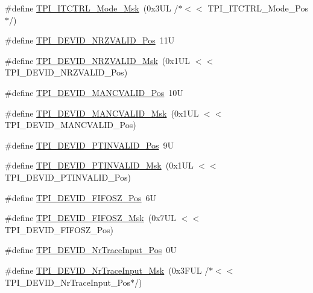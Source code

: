 \begin{DoxyCompactItemize}
\item 
\#define \hyperlink{group___c_m_s_i_s___t_p_i_gad6f87550b468ad0920d5f405bfd3f017}{T\+P\+I\+\_\+\+I\+T\+C\+T\+R\+L\+\_\+\+Mode\+\_\+\+Msk}~(0x3\+U\+L /$\ast$$<$$<$ T\+P\+I\+\_\+\+I\+T\+C\+T\+R\+L\+\_\+\+Mode\+\_\+\+Pos$\ast$/)
\item 
\#define \hyperlink{group___c_m_s_i_s___t_p_i_ga9f46cf1a1708575f56d6b827766277f4}{T\+P\+I\+\_\+\+D\+E\+V\+I\+D\+\_\+\+N\+R\+Z\+V\+A\+L\+I\+D\+\_\+\+Pos}~11U
\item 
\#define \hyperlink{group___c_m_s_i_s___t_p_i_gacecc8710a8f6a23a7d1d4f5674daf02a}{T\+P\+I\+\_\+\+D\+E\+V\+I\+D\+\_\+\+N\+R\+Z\+V\+A\+L\+I\+D\+\_\+\+Msk}~(0x1\+U\+L $<$$<$ T\+P\+I\+\_\+\+D\+E\+V\+I\+D\+\_\+\+N\+R\+Z\+V\+A\+L\+I\+D\+\_\+\+Pos)
\item 
\#define \hyperlink{group___c_m_s_i_s___t_p_i_ga675534579d9e25477bb38970e3ef973c}{T\+P\+I\+\_\+\+D\+E\+V\+I\+D\+\_\+\+M\+A\+N\+C\+V\+A\+L\+I\+D\+\_\+\+Pos}~10U
\item 
\#define \hyperlink{group___c_m_s_i_s___t_p_i_ga4c3ee4b1a34ad1960a6b2d6e7e0ff942}{T\+P\+I\+\_\+\+D\+E\+V\+I\+D\+\_\+\+M\+A\+N\+C\+V\+A\+L\+I\+D\+\_\+\+Msk}~(0x1\+U\+L $<$$<$ T\+P\+I\+\_\+\+D\+E\+V\+I\+D\+\_\+\+M\+A\+N\+C\+V\+A\+L\+I\+D\+\_\+\+Pos)
\item 
\#define \hyperlink{group___c_m_s_i_s___t_p_i_ga974cccf4c958b4a45cb71c7b5de39b7b}{T\+P\+I\+\_\+\+D\+E\+V\+I\+D\+\_\+\+P\+T\+I\+N\+V\+A\+L\+I\+D\+\_\+\+Pos}~9U
\item 
\#define \hyperlink{group___c_m_s_i_s___t_p_i_ga1ca84d62243e475836bba02516ba6b97}{T\+P\+I\+\_\+\+D\+E\+V\+I\+D\+\_\+\+P\+T\+I\+N\+V\+A\+L\+I\+D\+\_\+\+Msk}~(0x1\+U\+L $<$$<$ T\+P\+I\+\_\+\+D\+E\+V\+I\+D\+\_\+\+P\+T\+I\+N\+V\+A\+L\+I\+D\+\_\+\+Pos)
\item 
\#define \hyperlink{group___c_m_s_i_s___t_p_i_ga3c7bb073c7ef96c2c3491c523fcb5bbe}{T\+P\+I\+\_\+\+D\+E\+V\+I\+D\+\_\+\+F\+I\+F\+O\+S\+Z\+\_\+\+Pos}~6U
\item 
\#define \hyperlink{group___c_m_s_i_s___t_p_i_gac7e718d8f239920d5b65e3eaa1c490df}{T\+P\+I\+\_\+\+D\+E\+V\+I\+D\+\_\+\+F\+I\+F\+O\+S\+Z\+\_\+\+Msk}~(0x7\+U\+L $<$$<$ T\+P\+I\+\_\+\+D\+E\+V\+I\+D\+\_\+\+F\+I\+F\+O\+S\+Z\+\_\+\+Pos)
\item 
\#define \hyperlink{group___c_m_s_i_s___t_p_i_ga80ecae7fec479e80e583f545996868ed}{T\+P\+I\+\_\+\+D\+E\+V\+I\+D\+\_\+\+Nr\+Trace\+Input\+\_\+\+Pos}~0U
\item 
\#define \hyperlink{group___c_m_s_i_s___t_p_i_gabed454418d2140043cd65ec899abd97f}{T\+P\+I\+\_\+\+D\+E\+V\+I\+D\+\_\+\+Nr\+Trace\+Input\+\_\+\+Msk}~(0x3\+F\+U\+L /$\ast$$<$$<$ T\+P\+I\+\_\+\+D\+E\+V\+I\+D\+\_\+\+Nr\+Trace\+Input\+\_\+\+Pos$\ast$/)

\end{DoxyCompactItemize}
